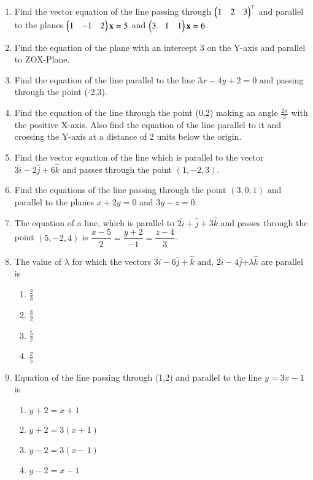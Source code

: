 \begin{enumerate}[label=\thesubsection.\arabic*,ref=\thesubsection.\theenumi]
	\item  Find the vector equation of the line passing through $\begin{pmatrix}1&2&3\end{pmatrix}^{\top}$ and parallel to the planes $\begin{pmatrix}1&-1&2\end{pmatrix}\mathbf{x} = 5$ and $\begin{pmatrix}3&1&1\end{pmatrix}\mathbf{x} = 6$.  
		\\
    \solution
		
	\item Find the equation of the plane with an intercept 3 on the Y-axis and parallel to ZOX-Plane.\\
    \solution
		
\item Find the equation of the line  parallel to the line $3x-4y+2=0$ and passing through the point (-2,3).
\label{chapters/11/10/3/7}
\\
\solution 

\item 
	Find the equation of the line through the point (0,2) making an angle $\frac{2\pi}{3}$ with the positive X-axis. Also find the equation of the line parallel to it and crossing the Y-axis at a distance of 2 units below the origin.
	\\
	\solution
\label{chapters/11/10/2/14}

\item  Find the vector equation of the line which is parallel to the vector $3\hat{i}-2\hat{j}+6\hat{k}$ and passes through the point $(1,-2,3)$.
\item Find the equations of the line passing through the point $(3,0,1)$ and parallel to the planes $x+2y=0$ and $3y-z=0.$
\item The equation of a line, which is parallel to $2\hat{i}+\hat{j}+3\hat{k}$ and passes through the point $(5,-2,4)$ is $\dfrac{x-5}{2}=\dfrac{y+2}{-1}=\dfrac{z-4}{3}$.
\item The value of $\lambda$ for which the vectors $3\hat{i}-6\hat{j}+\hat{k}$ $\text{and}$,  $2\hat{i}-4\hat{j}$+$\lambda\hat{k}$ are parallel is
	\begin{enumerate}
			\setlength{\itemsep}{1ex}
\item $\frac{2}{3}$
\item $\frac{3}{2}$
\item $\frac{5}{2}$
\item $\frac{2}{5}$
	\end{enumerate}	
\item Equation of the line passing through (1,2) and parallel to the line $y=3x-1$ is
\begin{enumerate}
\item $y+2=x+1$
\item $y+2=3(x+1)$
\item $y-2=3(x-1)$
\item $y-2=x-1$
\end{enumerate}
\end{enumerate}
